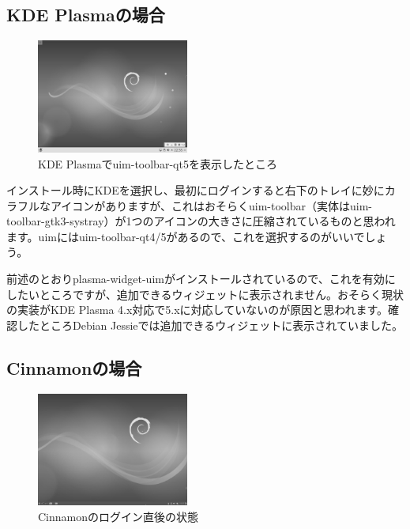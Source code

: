 \documentclass[mingoth,a4paper]{jsarticle}
\begin{document}
\subsection{KDE Plasmaの場合}
\begin{figure}
    \begin{center}
        \includegraphics[width=5cm]{image201708/kde-uim-toolbar-qt5_gray.png}
        \caption{KDE Plasmaでuim-toolbar-qt5を表示したところ}
    \end{center}
\end{figure}

インストール時にKDEを選択し、最初にログインすると右下のトレイに妙にカラフルなアイコンがありますが、これはおそらくuim-toolbar（実体はuim-toolbar-gtk3-systray）が1つのアイコンの大きさに圧縮されているものと思われます。uimにはuim-toolbar-qt4/5があるので、これを選択するのがいいでしょう。

前述のとおりplasma-widget-uimがインストールされているので、これを有効にしたいところですが、追加できるウィジェットに表示されません。おそらく現状の実装がKDE
Plasma
4.x対応で5.xに対応していないのが原因と思われます。確認したところDebian
Jessieでは追加できるウィジェットに表示されていました。

\subsection{Cinnamonの場合}
\begin{figure}
    \begin{center}
        \includegraphics[width=5cm]{image201708/cinnamon_gray.png}
        \caption{Cinnamonのログイン直後の状態}
    \end{center}
\end{figure}
\end{document}
